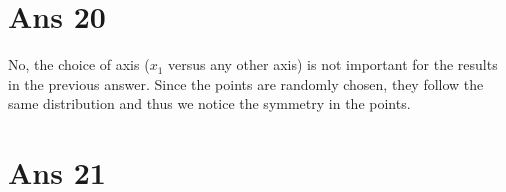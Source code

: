 \documentclass[10pt]{article}
\begin{document}
\section*{Ans 20}
\begin{flushleft}
No, the choice of axis ($x_{1}$ versus any other axis) is not important for the results in the previous answer. Since the points are randomly chosen, they follow the same distribution and thus we notice the symmetry in the points.\\
\end{flushleft}
\section*{Ans 21}
\begin{flushleft}
\begin{figure}[!htb]
    \begin{floatrow}

\end{floatrow}
\end{figure}
\end{flushleft}
\end{document}
